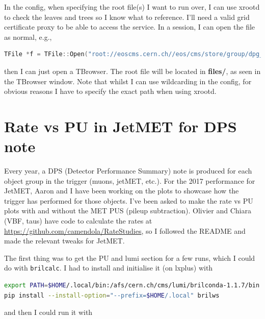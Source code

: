 In the config, when specifying the root file(s) I want to run over, I can use xrootd to check the leaves and trees so I know what to reference. I'll need a valid grid certificate proxy to be able to access the service. In a \ROOT session, I can open the file as normal, e.g.,

\begin{lstlisting}[belowskip=-0.7cm, language=C++, numbers=none]
TFile *f = TFile::Open("root://eoscms.cern.ch//eos/cms/store/group/dpg_trigger/comm_trigger/L1Trigger/safarzad/2017/ZeroBias/Collision2017-noRECO-l1t-integration-96p20/ZeroBias/crab_Collision2017-noRECO-l1t-integration-96p20__ZeroBias_Run2017C/170726_094745/0000/L1Ntuple_1.root")
\end{lstlisting}

then I can just open a TBrowser. The root file will be located in \textbf{\ROOT files/}, as seen in the TBrowser window. Note that whilst I can use wildcarding in the config, for obvious reasons I have to specify the exact path when using xrootd.

\fi



\section{Rate vs PU in JetMET for DPS note}

Every year, a DPS (Detector Performance Summary) note is produced for each object group in the trigger (muons, jetMET, etc.). For the 2017 performance for JetMET, Aaron and I have been working on the plots to showcase how the trigger has performed for those objects. I've been asked to make the rate vs PU plots with and without the MET PUS (pileup subtraction). Olivier and Chiara (VBF, taus) have code to calculate the rates at \url{https://github.com/camendola/RateStudies}, so I followed the README and made the relevant tweaks for JetMET.

The first thing was to get the PU and lumi section for a few runs, which I could do with \texttt{brilcalc}. I had to install and initialise it (on lxplus) with

\begin{lstlisting}[belowskip=-0.7cm, language=sh, numbers=none]
export PATH=$HOME/.local/bin:/afs/cern.ch/cms/lumi/brilconda-1.1.7/bin:$PATH # Needed each time to initialise
pip install --install-option="--prefix=$HOME/.local" brilws
\end{lstlisting}

and then I could run it with

